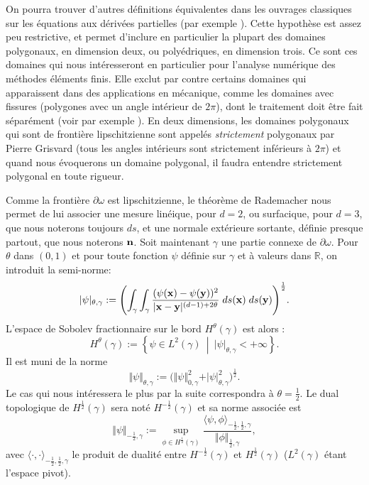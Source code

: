 \documentclass[11pt]{book}
\def\n{{\bf n}}
\def\x{{\bf x}}
\def\y{{\bf y}}
\newcommand{\R}{\mathbb{R}}
\begin{document}
On pourra trouver d'autres définitions équivalentes dans les ouvrages classiques sur les équations aux dérivées partielles (par exemple \cite[Section 1.3]{necas-67}).
Cette hypothèse est assez peu restrictive, et permet d'inclure en particulier la plupart des domaines polygonaux, en dimension deux, ou polyédriques, en dimension trois. Ce sont ces domaines qui nous intéresseront en particulier pour l'analyse numérique des méthodes éléments finis. Elle exclut par contre certains domaines qui apparaissent dans des applications en mécanique, comme les domaines avec fissures (polygones avec un angle intérieur de $2 \pi$), dont le traitement doit être fait séparément (voir par exemple \cite{grisvard-86}). En deux dimensions, les domaines polygonaux qui sont de frontière lipschitzienne sont appelés \emph{strictement} polygonaux par Pierre Grisvard (tous les angles intérieurs sont strictement inférieurs à $2\pi$) et quand nous évoquerons un domaine polygonal, il faudra entendre strictement polygonal en toute rigueur.

Comme la frontière $\partial \omega$ est lipschitzienne, le théorème de Rademacher \cite[Section 3.1.6]{federer-69} nous permet de lui associer une mesure linéique, pour $d=2$, ou surfacique, pour $d=3$, que nous noterons toujours $ds$, et une normale extérieure sortante, définie presque partout, que nous noterons $\n$.
Soit maintenant $\gamma$ une partie connexe de $\partial \omega$.
Pour $\theta$ dans $(0,1)$ et pour toute fonction $\psi$ définie sur $\gamma$ et à valeurs dans $\R$, on introduit la semi-norme:
\[
\vert \psi \vert_{\theta,\gamma} :=
 \Biggl(\int_{\gamma}\int_{\gamma} {  \frac{(\psi(\x) -
 \psi({\y}))^2}{| \x-\y |^{(d-1)+2\theta}} } \; ds(\x) \; ds({\y})
 \Biggr)^{\frac12}.
\]
L'espace de Sobolev fractionnaire sur le bord $H^\theta(\gamma)$ est alors \cite{grisvard-86}:
\[ 
H^{\theta}(\gamma) :=
\left\{ \psi \in L^2(\gamma) \:\middle|\: \vert \psi \vert_{\theta,\gamma} < + \infty \right\}.
\]
Il est muni de la norme
\[
\Vert \psi\Vert_{\theta,\gamma} := \Biggl(\Vert \psi\Vert_{0,\gamma}^2
  +
\vert \psi \vert_{\theta,\gamma}^2 \Biggr)^{\frac12}.
\]
Le cas qui nous intéressera le plus par la suite correspondra à $\theta = \frac12$.
Le dual topologique de $H^{\frac12} (\gamma)$ sera noté
$H^{-{\frac{1}{2}}}(\gamma)$ et sa norme associée est 
$$
\Vert \psi\Vert_{-\frac12,\gamma} := \sup_{\phi \in H^{\frac{1}{2}}(\gamma)} { \frac{ \langle \psi, \phi \rangle_{{-{\frac12}},{\frac12},\gamma}}{\Vert \phi\Vert_{\frac12,\gamma} }},
$$
avec $ \langle \cdot , \cdot  \rangle_{{-{\frac12}},{\frac12},\gamma}$ le produit de dualité entre $H^{-{\frac12}}(\gamma)$ et $H^{{\frac{1}{2}}}(\gamma)$ ($L^2(\gamma)$ étant l'espace pivot).
\end{document}

